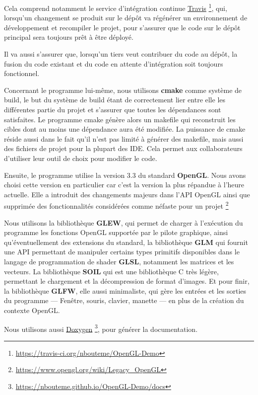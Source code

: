 \documentclass[pdftex, 11pt, a4paper, titlepage]{article}
\begin{document}
Cela comprend notamment le service d'intégration continue
\href{https://travis-ci.org/nbouteme/OpenGL-Demo}{{\color{blue}Travis}}
\footnote{\url{https://travis-ci.org/nbouteme/OpenGL-Demo}},
qui, lorsqu'un changement se produit sur le dépôt va régénérer un
environnement de développement et recompiler le projet, pour s'assurer
que le code sur le dépôt principal sera toujours prêt à être déployé.

Il va aussi s'assurer que, lorsqu'un tiers veut contribuer du code au
dépôt, la fusion du code existant et du code en attente d'intégration
soit toujours fonctionnel.

Concernant le programme lui-même, nous utilisons \textbf{cmake} comme
système de build, le but du système de build étant de correctement
lier entre elle les différentes partie du projet et s'assurer que
toutes les dépendances sont satisfaites. Le programme cmake génère
alors un makefile qui reconstruit les cibles dont au moins une
dépendance aura été modifiée. La puissance de cmake réside aussi dans
le fait qu'il n'est pas limité à générer des makefile, mais aussi des
fichiers de projet pour la plupart des IDE. Cela permet aux
collaborateurs d'utiliser leur outil de choix pour modifier le code.

Ensuite, le programme utilise la version 3.3 du standard
\textbf{OpenGL}.  Nous avons choisi cette version en particulier car
c'est la version la plus répandue à l'heure actuelle. Elle a introduit
des changements majeurs dans l'API OpenGL ainsi que supprimée des
fonctionnalités considérées comme néfaste pour un projet
\footnote{\url{https://www.opengl.org/wiki/Legacy_OpenGL}}

Nous utilisons la bibliothèque \textbf{GLEW}, qui permet de charger à
l'exécution du programme les fonctions OpenGL supportée par le pilote
graphique, ainsi qu'éventuellement des extensions du standard, la
bibliothèque \textbf{GLM} qui fournit une API permettant de manipuler
certains types primitifs disponibles dans le langage de programmation
de shader \textbf{GLSL}, notamment les matrices et les vecteurs. La
bibliothèque \textbf{SOIL} qui est une bibliothèque C très légère,
permettant le chargement et la décompression de format d'images. Et
pour finir, la bibliothèque \textbf{GLFW}, elle aussi minimaliste, qui
gère les entrées et les sorties du programme --- Fenêtre, souris,
clavier, manette --- en plus de la création du contexte OpenGL.

Nous utilisons aussi \href{https://nbouteme.github.io/OpenGL-Demo/docs}{{\color{blue}Doxygen}}
\footnote{\url{https://nbouteme.github.io/OpenGL-Demo/docs}},
 pour générer la documentation.
\end{document}
